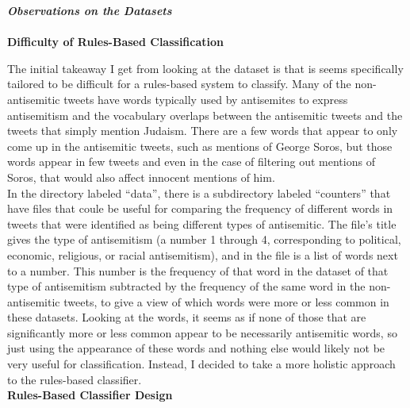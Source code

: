 \documentclass{article}
\begin{document}
{\bf \emph{Observations on the Datasets}}\\\\

{\bf Difficulty of Rules-Based Classification}

The initial takeaway I get from looking at the dataset is that is seems specifically tailored to be difficult for a rules-based system to classify. Many of the non-antisemitic tweets have words typically used by antisemites to express antisemitism and the vocabulary overlaps between the antisemitic tweets and the tweets that simply mention Judaism. There are a few words that appear to only come up in the antisemitic tweets, such as mentions of George Soros, but those words appear in few tweets and even in the case of filtering out mentions of Soros, that would also affect innocent mentions of him. \\

In the directory labeled ``data'', there is a subdirectory labeled ``counters'' that have files that coule be useful for comparing the frequency of different words in tweets that were identified as being different types of antisemitic. The file's title gives the type of antisemitism (a number 1 through 4, corresponding to political, economic, religious, or racial antisemitism), and in the file is a list of words next to a number. This number is the frequency of that word in the dataset of that type of antisemitism subtracted by the frequency of the same word in the non-antisemitic tweets, to give a view of which words were more or less common in these datasets. Looking at the words, it seems as if none of those that are significantly more or less common appear to be necessarily antisemitic words, so just using the appearance of these words and nothing else would likely not be very useful for classification. Instead, I decided to take a more holistic approach to the rules-based classifier. \\

{\bf Rules-Based Classifier Design}
\end{document}
